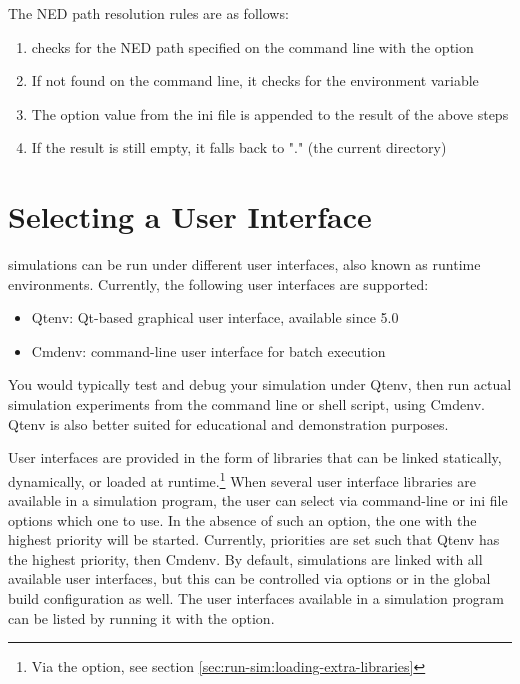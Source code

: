 The NED path resolution rules are as follows:

\begin{enumerate}
  \item {\opp} checks for the NED path specified on the command line with the  option
  \item If not found on the command line, it checks for the  environment variable
  \item The  option value from the ini file is appended to the result of the above steps
  \item If the result is still empty, it falls back to "." (the current directory)
\end{enumerate}


\section{Selecting a User Interface}
\label{sec:run-sim:selecting-user-interface}

{\opp} simulations can be run under different user interfaces, also known as runtime
environments. Currently, the following user interfaces are supported:

\begin{itemize}
  \item Qtenv: Qt-based graphical user interface, available since {\opp} 5.0
  \item Cmdenv: command-line user interface for batch execution
\end{itemize}

You would typically test and debug your simulation under Qtenv,
then run actual simulation experiments from the command line or shell
script, using Cmdenv. Qtenv is also better suited for
educational and demonstration purposes.

User interfaces are provided in the form of libraries that can be linked statically,
dynamically, or loaded at runtime.\footnote{Via the 
option, see section \ref{sec:run-sim:loading-extra-libraries}} When several user
interface libraries are available in a simulation program, the user can select
via command-line or ini file options which one to use. In the absence of such an
option, the one with the highest priority will be started. Currently, priorities
are set such that Qtenv has the highest priority, then Cmdenv.
By default, simulations are linked with all available user interfaces,
but this can be controlled via  options or in the {\opp}
global build configuration as well. The user interfaces available in a
simulation program can be listed by running it with the 
option.

